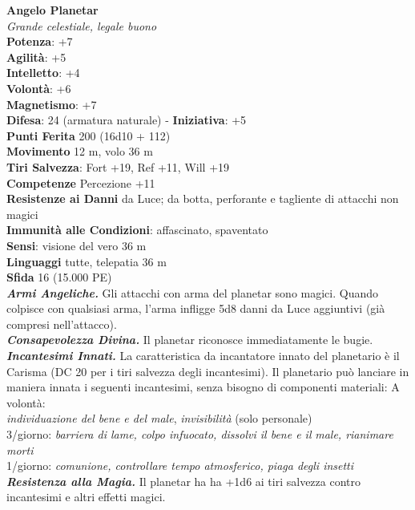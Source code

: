 \begin{multicols}{2}
\medskip\textbf{Angelo Planetar}\\
\emph{Grande celestiale, legale buono}\\
\textbf{Potenza}: +7\\
\textbf{Agilità}: +5\\
\textbf{Intelletto}: +4\\
\textbf{Volontà}: +6\\
\textbf{Magnetismo}: +7\\
\textbf{Difesa}: 24 (armatura naturale) - \textbf{Iniziativa}: +5\\
\textbf{Punti Ferita} 200 (16d10 + 112)\\
\textbf{Movimento} 12 m, volo 36 m\\
\textbf{Tiri Salvezza}: Fort +19, Ref +11, Will +19\\
\textbf{Competenze} Percezione +11\\
\textbf{Resistenze ai Danni} da Luce; da botta, perforante e tagliente di attacchi non magici\\
\textbf{Immunità alle Condizioni}: affascinato, spaventato\\
\textbf{Sensi}: visione del vero 36 m\\
\textbf{Linguaggi} tutte, telepatia 36 m\\
\textbf{Sfida} 16 (15.000 PE)\smallskip\\
\emph{\textbf{Armi Angeliche.}} Gli attacchi con arma del planetar sono magici. Quando colpisce con qualsiasi arma, l'arma infligge 5d8 danni da Luce aggiuntivi (già compresi nell'attacco).\\
\emph{\textbf{Consapevolezza Divina.}} Il planetar riconosce immediatamente le bugie.\\
\emph{\textbf{Incantesimi Innati.}} La caratteristica da incantatore innato del planetario è il Carisma (DC 20 per i tiri salvezza degli incantesimi). Il planetario può lanciare in maniera innata i seguenti incantesimi, senza bisogno di componenti materiali: A volontà:\\
\emph{individuazione del bene e del male}, \emph{invisibilità} (solo personale)\\
3/giorno: \emph{barriera di lame, colpo infuocato, dissolvi il bene e il} \emph{male, rianimare morti}\\
1/giorno: \emph{comunione, controllare tempo atmosferico, piaga degli insetti}\\
\emph{\textbf{Resistenza alla Magia.}} Il planetar ha ha +1d6 ai tiri salvezza contro incantesimi e altri effetti magici.\\

\end{multicols}
